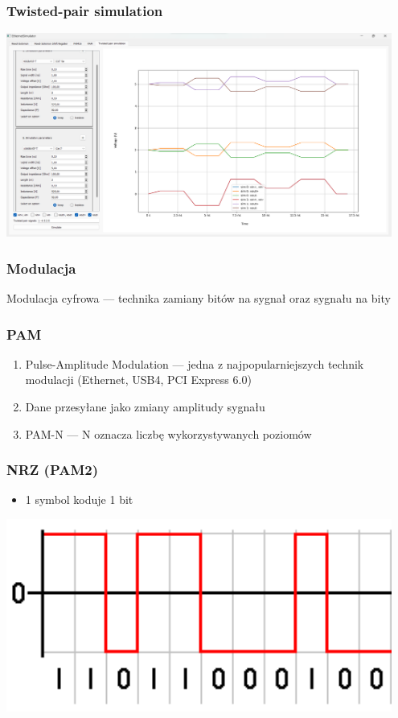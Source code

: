 \documentclass{beamer}
\begin{document}
\begin{frame}
\frametitle{Twisted-pair simulation}
\includegraphics[width=0.95\textwidth]{images/prezentacja_tp.png}
\end{frame}

\begin{frame}
\frametitle{Modulacja}
Modulacja cyfrowa --- technika zamiany bitów na sygnał oraz sygnału na bity
\end{frame}

\begin{frame}
\frametitle{PAM}
\begin{enumerate}
    \item Pulse-Amplitude Modulation --- jedna z najpopularniejszych technik modulacji (Ethernet, USB4, PCI Express 6.0)
    \item Dane przesyłane jako zmiany amplitudy sygnału
    \item PAM-N --- N oznacza liczbę wykorzystywanych poziomów
\end{enumerate}
\end{frame}

\begin{frame}
\frametitle{NRZ (PAM2)}
\begin{itemize}
    \item 1 symbol koduje 1 bit
\end{itemize}
\includegraphics[width=0.95\textwidth]{images/nrz_code.png}
\end{frame}
\end{document}
